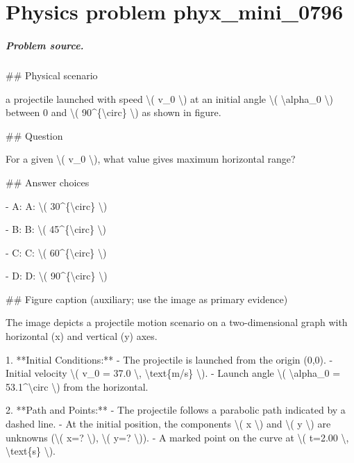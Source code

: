 
\chapter{Physics problem phyx\_mini\_0796}
\label{ch:PhyXMiniProblems_problem_phyx_mini_0796}

\paragraph{Problem source.}
\#\# Physical scenario

a projectile launched with speed \textbackslash{}( v\_0 \textbackslash{}) at an initial angle \textbackslash{}( \textbackslash{}alpha\_0 \textbackslash{}) between 0 and \textbackslash{}( 90\textasciicircum{}\{\textbackslash{}circ\} \textbackslash{}) as shown in figure.

\#\# Question

For a given \textbackslash{}( v\_0 \textbackslash{}), what value gives maximum horizontal range?

\#\# Answer choices

- A: A: \textbackslash{}( 30\textasciicircum{}\{\textbackslash{}circ\} \textbackslash{})

- B: B: \textbackslash{}( 45\textasciicircum{}\{\textbackslash{}circ\} \textbackslash{})

- C: C: \textbackslash{}( 60\textasciicircum{}\{\textbackslash{}circ\} \textbackslash{})

- D: D: \textbackslash{}( 90\textasciicircum{}\{\textbackslash{}circ\} \textbackslash{})

\#\# Figure caption (auxiliary; use the image as primary evidence)

The image depicts a projectile motion scenario on a two-dimensional graph with horizontal (x) and vertical (y) axes.

1. **Initial Conditions:**
   - The projectile is launched from the origin (0,0).
   - Initial velocity \textbackslash{}( v\_0 = 37.0 \textbackslash{}, \textbackslash{}text\{m/s\} \textbackslash{}).
   - Launch angle \textbackslash{}( \textbackslash{}alpha\_0 = 53.1\textasciicircum{}\textbackslash{}circ \textbackslash{}) from the horizontal.

2. **Path and Points:**
   - The projectile follows a parabolic path indicated by a dashed line.
   - At the initial position, the components \textbackslash{}( x \textbackslash{}) and \textbackslash{}( y \textbackslash{}) are unknowns (\textbackslash{}( x=? \textbackslash{}), \textbackslash{}( y=? \textbackslash{})).
   - A marked point on the curve at \textbackslash{}( t=2.00 \textbackslash{}, \textbackslash{}text\{s\} \textbackslash{}).


